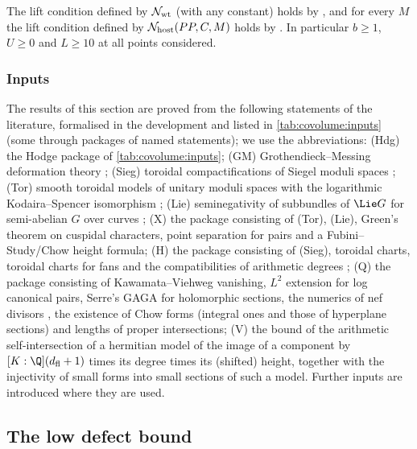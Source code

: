 The lift condition defined by $\mathcal N_{\mathrm{wt}}$ (with any constant) holds by
, and for every $M$ the lift condition defined by
$\mathcal N_{\mathrm{host}}(PP,C,M)$ holds by . In particular
$b\ge1$, $U\ge0$ and $L\ge10$ at all points considered.

\subsubsection*{Inputs}
The results of this section are proved from the following statements of the literature, formalised
in the development and listed in \cref{tab:covolume:inputs} (some through packages of named
statements); we use the abbreviations:
(Hdg) the Hodge package of \cref{tab:covolume:inputs};
(GM) Grothendieck--Messing deformation theory \cite{Messing1972};
(Sieg) toroidal compactifications of Siegel moduli spaces \cite{FaltingsChai1990};
(Tor) smooth toroidal models of unitary moduli spaces with the logarithmic Kodaira--Spencer isomorphism
\cite{Lan2013};
(Lie) seminegativity of subbundles of $\Lie G$ for semi-abelian $G$ over curves
\cite{FaltingsChai1990,MoretBailly1985};
(X) the package consisting of (Tor), (Lie), Green's theorem on cuspidal characters, point separation for
pairs \cite{AngehrnSiu1995} and a Fubini--Study/Chow height formula;
(H) the package consisting of (Sieg), toroidal charts, toroidal charts for fans and the compatibilities
of arithmetic degrees \cite{GilletSoule1990};
(Q) the package consisting of Kawamata--Viehweg vanishing, $L^2$ extension for log canonical pairs,
Serre's GAGA for holomorphic sections, the numerics of nef divisors \cite{Lazarsfeld2004}, the existence
of Chow forms (integral ones and those of hyperplane sections) and lengths of proper intersections;
(V) the bound of the arithmetic self-intersection of a hermitian model of the image of a component by
$[K:\Q](\liftonedfl+1)$ times its degree times its (shifted) height, together with the injectivity of small
forms into small sections of such a model.
Further inputs are introduced where they are used.

\subsection{The low defect bound}\label{pf:lift1:lowdef}


